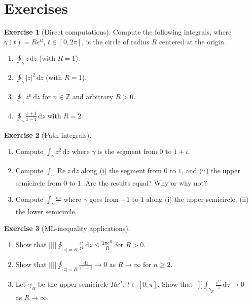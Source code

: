 \documentclass[12pt,a4paper,openany]{book}
\theoremstyle{definition}
\newtheorem{exercise}{Exercise}[chapter]
\theoremstyle{plain}
\theoremstyle{remark}
\newcommand{\Z}{\mathbb{Z}}
\DeclareMathOperator{\re}{Re}
\newcommand{\dd}{\mathrm{d}}
\newcommand{\abs}[1]{\left|#1\right|}
\newcommand{\conj}[1]{\overline{#1}}
\begin{document}
\section{Exercises}
\label{sec:ch4-exercises}

\begin{exercise}[Direct computations]\label{exo:direct-integrals}
Compute the following integrals, where $\gamma(t)=Re^{it}$, $t\in[0,2\pi]$,
is the circle of radius $R$ centered at the origin.
\begin{enumerate}[label=\textup{(\alph*)}]
  \item $\displaystyle\oint_\gamma\conj{z}\,\dd z$ (with $R=1$).
  \item $\displaystyle\oint_\gamma\abs{z}^2\,\dd z$ (with $R=1$).
  \item $\displaystyle\oint_\gamma z^n\,\dd z$ for $n\in\Z$ and arbitrary $R>0$.
  \item $\displaystyle\oint_\gamma\frac{z+1}{z-1}\,\dd z$ with $R=2$.
\end{enumerate}
\end{exercise}

\begin{exercise}[Path integrals]\label{exo:path-integrals}
\leavevmode
\begin{enumerate}[label=\textup{(\alph*)}]
  \item Compute $\int_\gamma z^2\,\dd z$ where $\gamma$ is the segment from
    $0$ to $1+i$.
  \item Compute $\int_\gamma\re z\,\dd z$ along (i) the segment from $0$ to $1$,
    and (ii) the upper semicircle from $0$ to $1$.  Are the results equal?  Why or
    why not?
  \item Compute $\int_\gamma\frac{\dd z}{z}$ where $\gamma$ goes from $-1$ to $1$
    along (i) the upper semicircle, (ii) the lower semicircle.
\end{enumerate}
\end{exercise}

\begin{exercise}[ML-inequality applications]\label{exo:ML-inequality}
\leavevmode
\begin{enumerate}[label=\textup{(\alph*)}]
  \item Show that $\abs[\big]{\oint_{\abs{z}=R}\frac{e^z}{z^2}\,\dd z}
    \le \frac{2\pi e^R}{R}$ for $R>0$.
  \item Show that $\abs[\big]{\oint_{\abs{z}=R}\frac{\dd z}{z^n+1}}
    \to 0$ as $R\to\infty$ for $n\ge 2$.
  \item Let $\gamma_R$ be the upper semicircle $Re^{it}$, $t\in[0,\pi]$.
    Show that $\abs[\big]{\int_{\gamma_R}\frac{e^{iz}}{z}\,\dd z}\to 0$
    as $R\to\infty$.
\end{enumerate}
\end{exercise}
\end{document}
